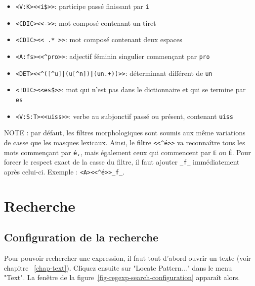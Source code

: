 \begin{itemize}
  \item \verb+<V:K><<i$>>+: participe passé finissant par \verb$i$
  \item \verb!<CDIC><<->>!: mot composé contenant un tiret
  \item \verb!<CDIC><< .* >>!: mot composé contenant deux espaces
  \item \verb!<A:fs><<^pro>>!: adjectif féminin singulier commençant par \verb$pro$
  \item \verb!<DET><<^([^u]|(u[^n])|(un.+))>>!: déterminant différent de \verb$un$
  \item \verb+<!DIC><<es$>>+: mot qui n’est pas dans le dictionnaire et qui se termine par \verb$es$
  \item \verb!<V:S:T><<uiss>>!: verbe au subjonctif passé ou présent, contenant \verb$uiss$
\end{itemize}

\noindent {}NOTE : par défaut, les filtres morphologiques sont soumis aux
même variations de casse que les masques lexicaux. Ainsi, le filtre \verb$<<^é>>$ va reconnaître
tous les mots commençant par \texttt{é,}, mais également ceux qui commencent par \texttt{E} ou 
\texttt{É}. 
Pour forcer le respect exact de la casse du filtre, il faut ajouter \verb+_f_+ immédiatement après
celui-ci. Exemple : \verb+<A><<^é>>_f_+.



\section{Recherche}
\subsection{Configuration de la recherche}
\label{section-configuration-recherche}
Pour pouvoir rechercher une expression, il faut tout d’abord ouvrir un texte (voir chapitre
~\ref{chap-text}). Cliquez ensuite sur "Locate Pattern..." dans le menu "Text". La fenêtre de la
figure~\ref{fig-regexp-search-configuration} apparaît alors.

